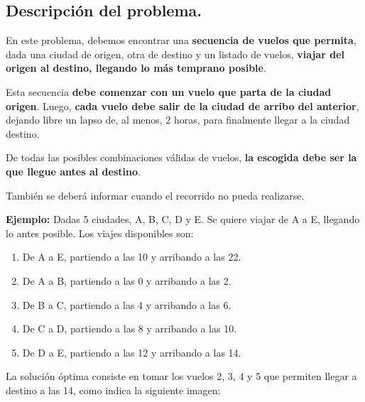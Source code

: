 \subsection{Descripción del problema.}

\vspace*{0.3cm}

En este problema, debemos encontrar una \textbf{secuencia de vuelos que
permita}, dada una ciudad de origen, otra de destino y un listado de vuelos,
\textbf{viajar del origen al destino, llegando lo más temprano posible}.

Esta secuencia \textbf{debe comenzar con un vuelo que parta de la ciudad
origen}. Luego, \textbf{cada vuelo debe salir de la ciudad de arribo del
anterior}, dejando libre un lapso de, al menos, 2 horas, para finalmente
llegar a la ciudad destino.

De todas las posibles combinaciones válidas de vuelos, \textbf{la escogida
debe ser la que llegue antes al destino}.

También se deberá informar cuando el recorrido no pueda realizarse.

\vspace*{0.5cm}

\textbf{Ejemplo:}
Dadas 5 ciudades, A, B, C, D y E. Se quiere viajar de A a E, llegando lo
antes posible.
Los viajes disponibles son:

\begin{enumerate}
  \item De A a E, partiendo a las 10 y arribando a las 22.

  \item De A a B, partiendo a las 0 y arribando a las 2.

  \item De B a C, partiendo a las 4 y arribando a las 6.

  \item De C a D, partiendo a las 8 y arribando a las 10.

  \item De D a E, partiendo a las 12 y arribando a las 14.
\end{enumerate}

La solución óptima consiste en tomar los vuelos 2, 3, 4 y 5 que permiten
llegar a destino a las 14, como indica la siguiente imagen:

